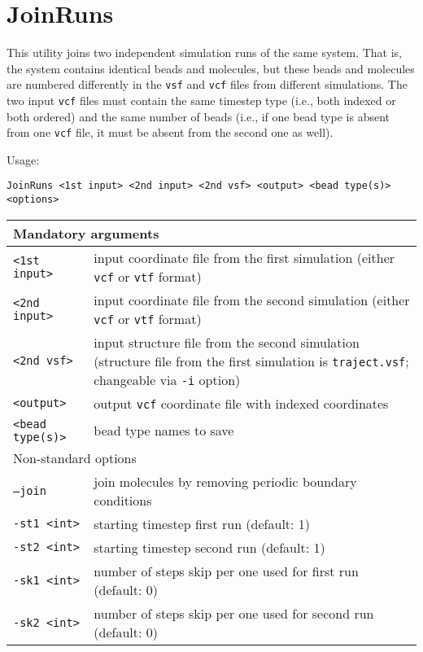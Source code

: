 \section{JoinRuns} \label{sec:JoinRuns}

This utility joins two independent simulation runs of the same system.
That is, the system contains identical beads and molecules, but these beads
and molecules are numbered differently in the \texttt{vsf} and \texttt{vcf}
files from different simulations. The two input \texttt{vcf} files must
contain the same timestep type (i.e., both indexed or both ordered) and the
same number of beads (i.e., if one bead type is absent from one
\texttt{vcf} file, it must be absent from the second one as well).

Usage:

\vspace{1em}
\noindent
\texttt{JoinRuns <1st input> <2nd input> <2nd vsf> <output> <bead type(s)> \\ <options>}

\vspace{1em}
\noindent
\begin{longtable}{p{}p{}}
  \toprule
  \multicolumn{2}{l}{Mandatory arguments} \\
  \midrule
  \texttt{<1st input>} & input coordinate file from the first simulation (either \texttt{vcf} or
    \texttt{vtf} format) \\
  \texttt{<2nd input>} & input coordinate file from the second simulation (either \texttt{vcf} or
    \texttt{vtf} format) \\
  \texttt{<2nd vsf>} & input structure file from the second simulation
    (structure file from the first simulation is \texttt{traject.vsf};
    changeable via \texttt{-i} option) \\
  \texttt{<output>} & output \texttt{vcf} coordinate file with indexed
    coordinates \\
  \texttt{<bead type(s)>} & bead type names to save \\
  \toprule
  \multicolumn{2}{l}{Non-standard options} \\
  \midrule
  \texttt{--join} & join molecules by removing periodic boundary conditions \\
  \texttt{-st1 <int>} & starting timestep first run (default: 1) \\
  \texttt{-st2 <int>} & starting timestep second run (default: 1) \\
  \texttt{-sk1 <int>} & number of steps skip per one used for first run (default: 0) \\
  \texttt{-sk2 <int>} & number of steps skip per one used for second run (default: 0) \\
  \bottomrule
\end{longtable}
